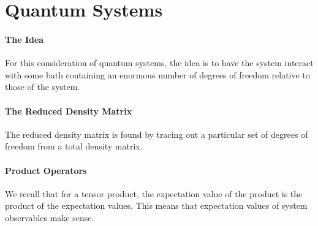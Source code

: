 \section{Quantum Systems}

\paragraph{The Idea}
For this consideration of quantum systems, the idea is to have the system interact with some bath containing an enormous number of degrees of freedom relative to those of the system.

\paragraph{The Reduced Density Matrix}
The reduced density matrix is found by tracing out a particular set of degrees of freedom from a total density matrix.

\paragraph{Product Operators}
We recall that for a tensor product, the expectation value of the product is the product of the expectation values. This means that expectation values of system observables make sense.

